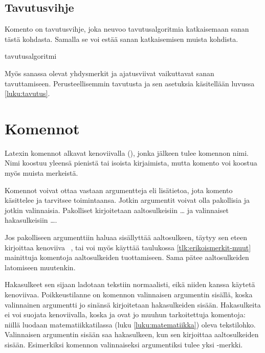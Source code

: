 \subsection{Tavutusvihje}

Komento \komentom{-} on tavutusvihje, joka neuvoo tavutusalgoritmia
katkaisemaan sanan tästä kohdasta. Samalla se voi estää sanan
katkaisemisen muista kohdista.

\begin{koodilohkosis}
tavutus\-algo\-ritmi
\end{koodilohkosis}

Myös sanassa olevat yhdysmerkit ja ajatusviivat vaikuttavat sanan
tavuttamiseen. Perusteellisemmin tavutusta ja sen asetuksia käsitellään
luvussa \ref{luku:tavutus}.

\section{Komennot}
\label{luku:komennot}

Latexin komennot alkavat kenoviivalla (\koodi{\textbackslash}), jonka
jälkeen tulee komennon nimi. Nimi koostuu yleensä pienistä tai isoista
kirjaimista, mutta komento voi koostua myös muista merkeistä.

Komennot voivat ottaa vastaan argumentteja eli lisätietoa, jota komento
käsittelee ja tarvitsee toimintaansa. Jotkin argumentit voivat olla
pakollisia ja jotkin valinnaisia. Pakolliset kirjoitetaan
aaltosulkeisiin \koodi{\{}\ldots\koodi{\}} ja valinnaiset hakasulkeisiin
\koodi{[}\ldots\koodi{]}.

\begin{koodilohkosis}
\komento
{}
\end{koodilohkosis}

Jos pakolliseen argumenttiin haluaa sisällyttää aaltosulkeen, täytyy sen
eteen kirjoittaa kenoviiva \komento{\{}~\komento{\}}, tai voi myös
käyttää taulukossa \ref{tlk:erikoismerkit-muut} mainittuja komentoja
aaltosulkeiden tuottamiseen. Sama pätee aaltosulkeiden latomiseen
muutenkin.

Hakasulkeet sen sijaan ladotaan tekstiin normaalisti, eikä niiden kanssa
käytetä kenoviivaa. Poikkeustilanne on komennon valinnaisen argumentin
sisällä, koska valinnainen argumentti jo sinänsä kirjoitetaan
hakasulkeiden sisään. Hakasulkeita ei voi suojata kenoviivalla, koska
\komento{[} ja \komento{]} ovat jo muuhun tarkoitettuja komentoja:
niillä luodaan matematiikkatilassa (luku \ref{luku:matematiikka}) oleva
tekstilohko. Valinnaisen argumentin sisään saa hakasulkeen, kun sen
kirjoittaa aaltosulkeiden sisään. Esimerkiksi komennon
\komentox[{[}\{{]}\}{]}]{komento} valinnaiseksi argumentiksi tulee yksi
\koodi{]}-merkki.

